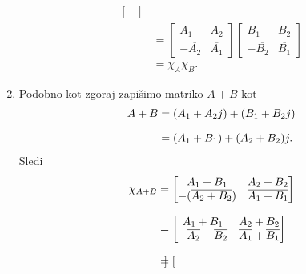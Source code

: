 \documentclass[mat1, tisk]{fmfdelo}
\numberwithin{equation}{section}
\begin{document}
\begin{dokaz}
\begin{enumerate}
\begin{equation*}
\begin{aligned}
\begin{bmatrix}
                    \end{bmatrix} \\
                    &= 
                    \begin{bmatrix}
                        A_{1} & A_{2} \\
                        -\overline{A_{2}} & \overline{A_{1}}
                    \end{bmatrix} 
                    \begin{bmatrix}
                        B_{1} & B_{2}\\
                        -\overline{B_{2}} & \overline{B_{1}}
                    \end{bmatrix} \\
                    &= \chi_{A} \chi_{B}.
                \end{aligned}  
        \end{equation*}
        \item Podobno kot zgoraj zapišimo matriko $A + B$ kot
        \begin{equation*}
            \setlength{\jot}{10pt}
                \begin{aligned}
                    A + B &= (A_{1} + A_{2}j) + (B_{1} + B_{2}j) \\
                    &= (A_{1} + B_{1}) + (A_{2} + B_{2})j.
                \end{aligned}  
        \end{equation*}
        Sledi
        \begin{equation*}
            \setlength{\jot}{10pt}
                \begin{aligned}
                    \chi_{A+B} &= 
                    \begin{bmatrix}
                        A_{1} + B_{1} &  A_{2} + B_{2}\\
                        - (\overline{A_{2} + B_{2}}) & \overline{A_{1} + B_{1}}
                    \end{bmatrix} \\
                    &=
                    \begin{bmatrix}
                        A_{1} + B_{1} & A_{2} + B_{2} \\
                        - \overline{A_{2}} - \overline{B_{2}} & \overline{A_{1}} + \overline{B_{1}}
                    \end{bmatrix} \\
                    &= 
                    \begin{bmatrix}

\end{bmatrix}
\end{aligned}
\end{equation*}
\end{enumerate}
\end{dokaz}
\end{document}
